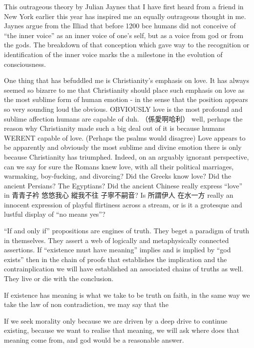 This outrageous theory by Julian Jaynes that I have first heard from a friend in New York earlier this year has inspired me an equally outrageous thought in me. Jaynes argue from the Illiad that before 1200 bce humans did not conceive of “the inner voice” as an inner voice of one’s self, but as a voice from god or from the gods. The breakdown of that conception which gave way to the recognition or identification of the inner voice marks the a milestone in the evolution of consciousness. 

One thing that has befuddled me is Christianity’s emphasis on love. It has always seemed so bizarre to me that Christianity should place such emphasis on love as the most sublime form of human emotion - in the sense that the position appears so very sounding loud the obvious. OBVIOUSLY love is the most profound and sublime affection humans are capable of duh. （係愛啊哈利） well, perhaps the reason why Christianity made such a big deal out of it is because humans WERENT capable of love. (Perhaps the psalms would disagree) Love appears to be apparently and obviously the most sublime and divine emotion there is only because Christianity has triumphed. Indeed, on an arguably ignorant perspective, can we say for sure the Romans knew love, with all their political marriages, warmaking, boy-fucking, and divorcing? Did the Greeks know love? Did the ancient Persians? The Egyptians? Did the ancient Chinese really express “love” in 青青子衿 悠悠我心 縱我不往 子寧不嗣音? Is 所謂伊人 在水一方 really an innocent expression of playful flirtiness across a stream, or is it a grotesque and lustful display of “no means yes”? 



“If and only if” propositions are engines of truth. They beget a paradigm of truth in themselves. They assert a web of logically and metaphysically connected assertions. If “existence must have meaning” implies and is implied by “god exists” then in the chain of proofs that establishes the implication and the contrainplication we will have established an associated chains of truths as well. They live or die with the conclusion. 

If existence has meaning is what we take to be truth on faith, in the same way we take the law of non contradiction, we may say that the

If we seek morality only because we are driven by a deep drive to continue existing, because we want to realise that meaning, we will ask where does that meaning come from, and god would be a reasonable answer. 


